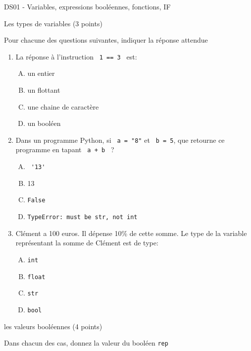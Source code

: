 \documentclass[a4paper,12pt,openany]{book}
\begin{document}
\begin{center}\begin{large}
DS01 - Variables, expressions booléennes, fonctions, IF
\end{large}\end{center}

\exo \qquad Les types de variables \hfill
(3 points)

Pour chacune des questions suivantes, indiquer la réponse attendue

\begin{enumerate}
	\item La réponse à l'instruction \verb+ 1 == 3 + est:
	\begin{enumerate}[A.]
		\item un entier
		\item un flottant
		\item une chaine de caractère
		\item un booléen
	\end{enumerate}		
	
	\medskip
	
	\item Dans un programme Python, si \verb+ a = "8"+ et \verb+ b = 5+, que retourne ce programme en tapant \verb- a + b - ?
	\begin{enumerate}[A.]
		\item \verb+ '13'+
		\item 13
		\item \verb+False+
		\item \verb+TypeError: must be str, not int+
	\end{enumerate}
	
	\medskip
	
	\item Clément a 100 euros. Il dépense 10\% de cette somme. Le type de la variable représentant la somme de Clément est de type:
	
	\begin{enumerate}[A.]
		\item \verb+int+
		\item \verb+float+
		\item \verb+str+
		\item \verb+bool+
	\end{enumerate}
\end{enumerate}

\bigskip

\exo \qquad les valeurs booléennes \hfill
(4 points)

Dans chacun des cas, donnez la valeur du booléen \verb+rep+
\end{document}
